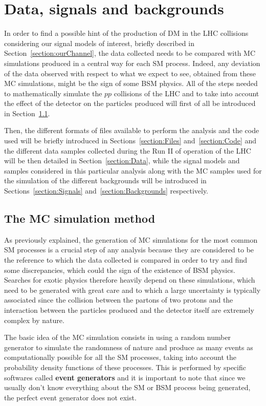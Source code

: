 \documentclass[a4paper, 10pt, openright]{report}
\begin{document}
\chapter{Data, signals and backgrounds} \label{chapter:Samples}

In order to find a possible hint of the production of \ac{DM} in the \ac{LHC} collisions considering our signal models of interest, briefly described in Section~\ref{section:ourChannel}, the data collected needs to be compared with \acf{MC} simulations produced in a central way for each \ac{SM} process. Indeed, any deviation of the data observed with respect to what we expect to see, obtained from these \ac{MC} simulations, might be the sign of some \ac{BSM} physics. All of the steps needed to mathematically simulate the $pp$ collisions of the \ac{LHC} and to take into account the effect of the detector on the particles produced will first of all be introduced in Section~\ref{section:MC}.

Then, the different formats of files available to perform the analysis and the code used will be briefly introduced in Sections~\ref{section:Files} and~\ref{section:Code} and the different data samples collected during the Run II of operation of the \ac{LHC} will be then detailed in Section~\ref{section:Data}, while the signal models and samples considered in this particular analysis along with the \ac{MC} samples used for the simulation of the different backgrounds will be introduced in Sections~\ref{section:Signals} and~\ref{section:Backgrounds} respectively.

\section{The \acf{MC} simulation method} \label{section:MC}

As previously explained, the generation of \ac{MC} simulations for the most common \ac{SM} processes is a crucial step of any analysis because they are considered to be the reference to which the data collected is compared in order to try and find some discrepancies, which could the sign of the existence of \ac{BSM} physics. Searches for exotic physics therefore heavily depend on these simulations, which need to be generated with great care and to which a large uncertainty is typically associated since the collision between the partons of two protons and the interaction between the particles produced and the detector itself are extremely complex by nature. 

The basic idea of the \ac{MC} simulation consists in using a random number generator to simulate the randomness of nature and produce as many events as computationally possible for all the \ac{SM} processes, taking into account the probability density functions of these processes. This is performed by specific softwares called \textbf{event generators} and it is important to note that since we usually don't know everything about the \ac{SM} or \ac{BSM} process being generated, the perfect event generator does not exist.
\end{document}
